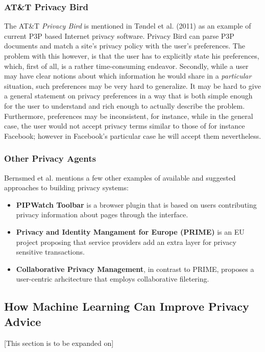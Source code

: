 \subsubsection{AT\&T Privacy Bird}
The AT\&T \emph{Privacy Bird} is mentioned in T{\o}ndel et al. (2011) as an example of current P3P based Internet privacy software. Privacy Bird can parse P3P documents and match a site's privacy policy with the user's preferences. The problem with this however, is that the user has to explicitly state his preferences, which, first of all, is a rather time-consuming endeavor. Secondly, while a user may have clear notions about which information he would share in a \emph{particular} situation, such preferences may be very hard to generalize. It may be hard to give a general statement on privacy preferences in a way that is both simple enough for the user to understand and rich enough to actually describe the problem. Furthermore, preferences may be inconsistent, for instance, while in the general case, the user would not accept privacy terms similar to those of for instance Facebook; however in Facebook's particular case he will accept them nevertheless.

\subsubsection{Other Privacy Agents}
Bernsmed et al. mentions a few other examples of available and suggested approaches to building privacy systems:

\begin{itemize}
\item \textbf{PIPWatch Toolbar} is a browser plugin that is based on users contributing privacy information about pages through the interface.
\item \textbf{Privacy and Identity Mangament for Europe (PRIME)} is an EU project proposing that service providers add an extra layer for privacy sensitive transactions.
\item \textbf{Collaborative Privacy Management}, in contrast to PRIME, proposes a user-centric arhcitecture that employs collaborative filetering.
\end{itemize}

\subsection{How Machine Learning Can Improve Privacy Advice}

[This section is to be expanded on]

